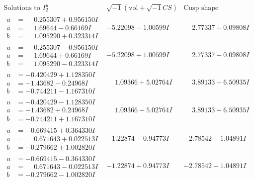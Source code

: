 \documentclass[1p]{elsarticle_modified}
\theoremstyle{definition}
\newcommand{\I}{\sqrt{-1}}
\begin{document}
$$\begin{array}{c|c|c}  
\text{Solutions to }I^u_{2}& \I (\text{vol} + \sqrt{-1}CS) & \text{Cusp shape}\\
 \hline 
\begin{aligned}
u &= \phantom{-}0.255307 + 0.956150 I \\
a &= \phantom{-}1.69644 - 0.66169 I \\
b &= \phantom{-}1.095290 + 0.323314 I\end{aligned}
 & -5.22098 - 1.00599 I & \phantom{-}2.77337 + 0.09808 I \\ \hline\begin{aligned}
u &= \phantom{-}0.255307 - 0.956150 I \\
a &= \phantom{-}1.69644 + 0.66169 I \\
b &= \phantom{-}1.095290 - 0.323314 I\end{aligned}
 & -5.22098 + 1.00599 I & \phantom{-}2.77337 - 0.09808 I \\ \hline\begin{aligned}
u &= -0.420429 + 1.128350 I \\
a &= -1.43682 - 0.24968 I \\
b &= -0.744211 - 1.167310 I\end{aligned}
 & \phantom{-}1.09366 + 5.02764 I & \phantom{-}3.89133 - 6.50935 I \\ \hline\begin{aligned}
u &= -0.420429 - 1.128350 I \\
a &= -1.43682 + 0.24968 I \\
b &= -0.744211 + 1.167310 I\end{aligned}
 & \phantom{-}1.09366 - 5.02764 I & \phantom{-}3.89133 + 6.50935 I \\ \hline\begin{aligned}
u &= -0.669415 + 0.364330 I \\
a &= \phantom{-}0.671643 + 0.022513 I \\
b &= -0.279662 + 1.002820 I\end{aligned}
 & -1.22874 - 0.94773 I & -2.78542 + 1.04891 I \\ \hline\begin{aligned}
u &= -0.669415 - 0.364330 I \\
a &= \phantom{-}0.671643 - 0.022513 I \\
b &= -0.279662 - 1.002820 I\end{aligned}
 & -1.22874 + 0.94773 I & -2.78542 - 1.04891 I \\ \hline\begin{aligned}

\end{aligned}
\end{array}$$
\end{document}
